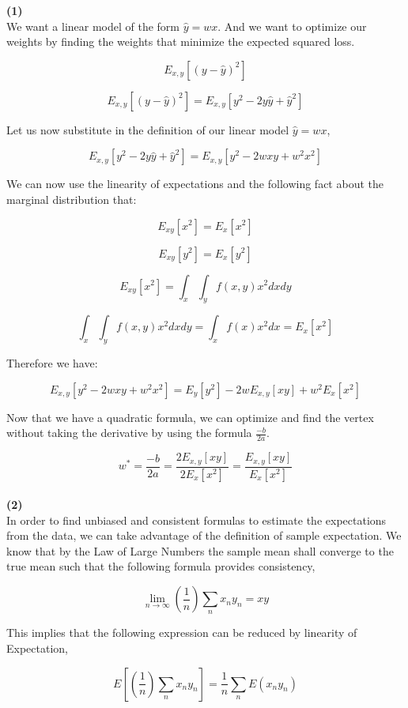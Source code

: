 \documentclass[submit]{harvardml}
\begin{document}
\begin{tcolorbox}[breakable]

\textbf{(1)}\\

We want a linear model of the form $\hat{y} = wx$. And we want to optimize our weights by finding the weights that minimize the expected squared loss. 

$$ E_{x,y}[(y - \hat{y})^2] $$

$$ E_{x,y}[(y - \hat{y})^2]  =  E_{x,y}[y^2 - 2y\hat{y}  + \hat{y}^2]$$

Let us now substitute in the definition of our linear model $\hat{y} = wx$,

$$ E_{x,y}[y^2 - 2y\hat{y}  + \hat{y}^2] = E_{x,y}[y^2 - 2wxy  + w^2x^2]$$

We can now use the linearity of expectations and the following fact about the marginal distribution that:

$$ E_{xy}[x^2] = E_x[x^2]$$

$$ E_{xy}[y^2] = E_x[y^2]$$

$$ E_{xy}[x^2] = \int_x\int_y f(x,y)x^2 dxdy$$

$$ \int_x\int_y f(x,y)x^2 dxdy = \int_x f(x)x^2 dx = E_{x}[x^2]$$

Therefore we have:

$$ E_{x,y}[y^2 - 2wxy  + w^2x^2] = E_{y}[y^2] - 2wE_{x,y}[xy] + w^2E_{x}[x^2]$$

Now that we have a quadratic formula, we can optimize and find the vertex without taking the derivative by using the formula $\frac{-b}{2a}$.

$$ w^{*} = \frac{-b}{2a} = \frac{2E_{x,y}[xy]}{2E_{x}[x^2]}  = \boxed{ \frac{E_{x,y}[xy]}{E_{x}[x^2]}}$$\\

\textbf{(2)}\\

In order to find unbiased and consistent formulas to estimate the expectations from the data, we can take advantage of the definition of sample expectation. We know that by the Law of Large Numbers the sample mean shall converge to the true mean such that the following formula provides consistency,

$$\lim_{n \to \infty} (\frac{1}{n})\sum\limits_n x_n y_n = xy$$

This implies that the following expression can be reduced by linearity of Expectation,

$$ E[(\frac{1}{n})\sum\limits_n x_n y_n] = \frac{1}{n} \sum_n E(x_n y_n) $$


\end{tcolorbox}
\end{document}
